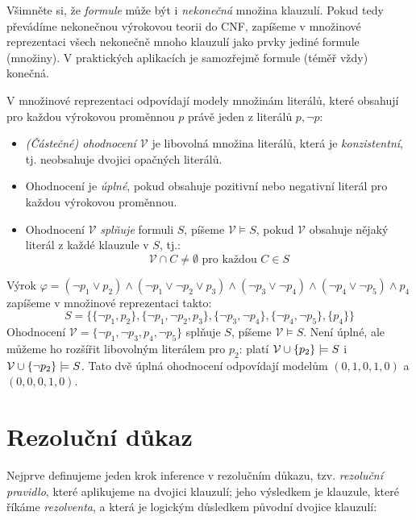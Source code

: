 \begin{remark}
    Všimněte si, že \emph{formule} může být i \emph{nekonečná} množina klauzulí. Pokud tedy převádíme nekonečnou výrokovou teorii do CNF, zapíšeme v množinové reprezentaci všech nekonečně mnoho klauzulí jako prvky jediné formule (množiny). V praktických aplikacích je samozřejmě formule (téměř vždy) konečná.
\end{remark}

V množinové reprezentaci odpovídají modely množinám literálů, které obsahují pro každou výrokovou proměnnou $p$ právě jeden z literálů $p,\neg p$:
\begin{itemize}
    \item \emph{(Částečné) ohodnocení $\mathcal V$} je libovolná množina literálů, která je \emph{konzistentní}, tj. neobsahuje dvojici opačných literálů. 
    \item Ohodnocení je \emph{úplné}, pokud obsahuje pozitivní nebo negativní literál pro každou výrokovou proměnnou.
    \item Ohodnocení $\mathcal V$ \emph{splňuje} formuli $S$, píšeme $\mathcal V\models S$, pokud $\mathcal V$ obsahuje nějaký literál z každé klauzule v $S$, tj.:
    $$
    \mathcal V\cap C\neq\emptyset\text{ pro každou }C\in S
    $$
\end{itemize}

\begin{example}\label{example:set-representation}
    Výrok $\varphi=(\neg p_1\lor p_2)\land(\neg p_1\lor\neg p_2\lor p_3)\land(\neg p_3\lor\neg p_4)\land(\neg p_4\lor \neg p_5)\land p_4$ zapíšeme v množinové reprezentaci takto:
    $$
    S=\{\{\neg p_1,p_2\},\{\neg p_1,\neg p_2,p_3\},\{\neg p_3,\neg p_4\},\{\neg p_4,\neg p_5\},\{p_4\}\}
    $$
    Ohodnocení $\mathcal V=\{\neg p_1,\neg p_3,p_4,\neg p_5\}$ splňuje $S$, píšeme $\mathcal V\models S$. Není úplné, ale můžeme ho rozšířit libovolným literálem pro $p_2$: platí $\mathcal V\mathbin{\cup}\{p_2\}\models S$ i $\mathcal V\mathbin{\cup}\{\neg p_2\}\models S$. Tato dvě úplná ohodnocení odpovídají modelům $(0,1,0,1,0)$ a $(0,0,0,1,0)$.
\end{example}


\section{Rezoluční důkaz}

Nejprve definujeme jeden krok inference v rezolučním důkazu, tzv. \emph{rezoluční pravidlo}, které aplikujeme na dvojici klauzulí; jeho výsledkem je klauzule, které říkáme \emph{rezolventa}, a která je logickým důsledkem původní dvojice klauzulí:


